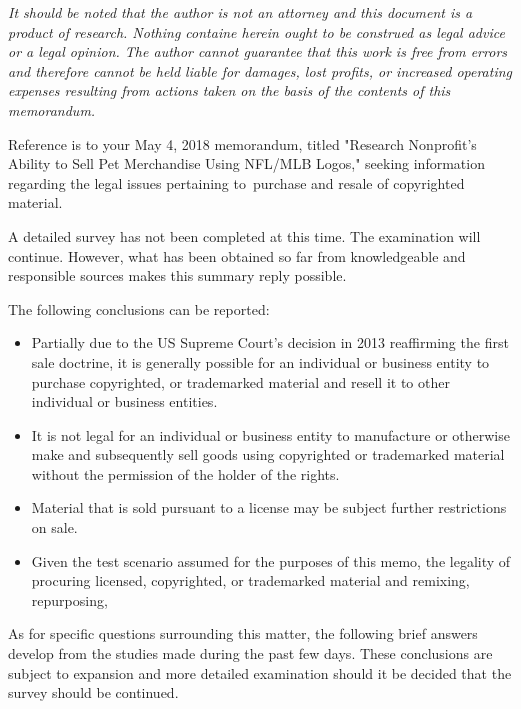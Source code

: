 \documentclass[letterpaper,11pt]{texMemo}
\begin{document}
\maketitle

\emph{It should be noted that the author is not an attorney and this document is a product of research. Nothing containe herein ought to be construed as legal advice or a legal opinion. The author cannot guarantee that this work is free from errors and therefore cannot be held liable for damages, lost profits, or increased operating expenses resulting from actions taken on the basis of the contents of this memorandum.}

Reference is to your May 4, 2018 memorandum, titled "Research Nonprofit's Ability to Sell Pet Merchandise Using NFL/MLB Logos," seeking information regarding the legal issues pertaining to\ purchase and resale of copyrighted material.

A detailed survey has not been completed at this time.  The examination will continue.  However, what has been obtained so far from knowledgeable and responsible sources makes this summary reply possible.

The following conclusions can be reported:

\begin{itemize}
 \item Partially due to the US Supreme Court's decision in 2013 reaffirming the first sale doctrine, it is generally possible for an individual or business entity to purchase copyrighted, or trademarked material and resell it to other individual or business entities.
 \item It is not legal for an individual or business entity to manufacture or otherwise make and subsequently sell goods using copyrighted or trademarked material without the permission of the holder of the rights.
 \item Material that is sold pursuant to a license may be subject further restrictions on sale.
 \item Given the test scenario assumed for the purposes of this memo, the legality of procuring licensed, copyrighted, or trademarked material and remixing, repurposing, 

\end{itemize}

As for specific questions surrounding this matter, the following brief answers develop from the studies made during the past few days.  These conclusions are subject to expansion and more detailed examination should it be decided that the survey should be continued.
\end{document}
